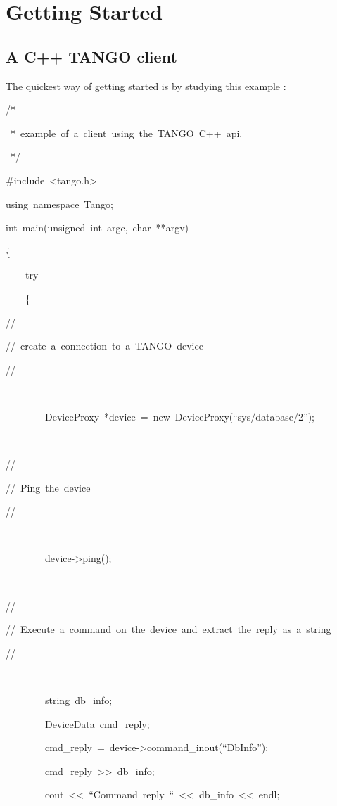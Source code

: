 
\chapter{Getting Started}

\section{A C++ TANGO client}

\noindent The quickest way of getting started is by studying this
example :


\begin{lyxcode}
\noindent /{*}~

\noindent ~{*}~example~of~a~client~using~the~TANGO~C++~api.

\noindent ~{*}/

\noindent \#include~<tango.h>

\noindent using~namespace~Tango;

\noindent int~main(unsigned~int~argc,~char~{*}{*}argv)

\noindent \{

~~~~try

~~~~\{

//

//~create~a~connection~to~a~TANGO~device

//

~

~~~~~~~~DeviceProxy~{*}device~=~new~DeviceProxy(``sys/database/2'');

~

//

//~Ping~the~device

//

~

~~~~~~~~device->ping();

~

//

//~Execute~a~command~on~the~device~and~extract~the~reply~as~a~string

//

~

~~~~~~~~string~db\_info;~

~~~~~~~~DeviceData~cmd\_reply;

~~~~~~~~cmd\_reply~=~device->command\_inout(``DbInfo'');

~~~~~~~~cmd\_reply~>\textcompwordmark{}>~db\_info;

~~~~~~~~cout~<\textcompwordmark{}<~``Command~reply~``~<\textcompwordmark{}<~db\_info~<\textcompwordmark{}<~endl;


\end{lyxcode}

